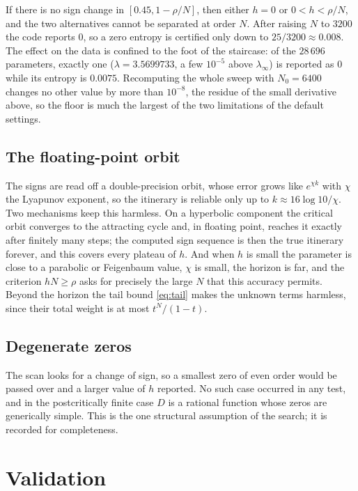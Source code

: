 \documentclass[11pt]{article}
\theoremstyle{plain}
\theoremstyle{definition}
\begin{document}
If there is no sign change in $[0.45,1-\rho/N]$, then either $h=0$ or $0<h<\rho/N$, and the
two alternatives cannot be separated at order $N$.  After raising $N$ to $3200$ the code
reports $0$, so a zero entropy is certified only down to $25/3200\approx0.008$.  The effect
on the data is confined to the foot of the staircase: of the $28\,696$ parameters, exactly
one ($\lambda=3.5699733$, a few $10^{-5}$ above $\lambda_\infty$) is reported as $0$ while
its entropy is $0.0075$.  Recomputing the whole sweep with $N_0=6400$ changes no other
value by more than $10^{-8}$, the residue of the small derivative above, so the floor is much
the largest of the two limitations of the default settings.

\subsection{The floating-point orbit}\label{sec:float}

The signs are read off a double-precision orbit, whose error grows like $e^{\chi k}$
with $\chi$ the Lyapunov exponent, so the itinerary is reliable only up to
$k\approx16\log10/\chi$.  Two mechanisms keep this harmless.  On a hyperbolic component
the critical orbit converges to the attracting cycle and, in floating point, reaches it
exactly after finitely many steps; the computed sign sequence is then the true itinerary
forever, and this covers every plateau of $h$.  And when $h$ is small the parameter is
close to a parabolic or Feigenbaum value, $\chi$ is small, the horizon is far, and the
criterion $hN\ge\rho$ asks for precisely the large $N$ that this accuracy permits.  Beyond
the horizon the tail bound \eqref{eq:tail} makes the unknown terms harmless, since their
total weight is at most $t^N/(1-t)$.

\subsection{Degenerate zeros}

The scan looks for a change of sign, so a smallest zero of even order would be passed over
and a larger value of $h$ reported.  No such case occurred in any test, and in the
postcritically finite case $D$ is a rational function whose zeros are generically simple.
This is the one structural assumption of the search; it is recorded for completeness.

\section{Validation}\label{sec:validation}
\end{document}
